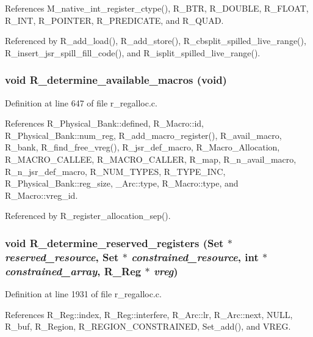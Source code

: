 References M\_\-native\_\-int\_\-register\_\-ctype(), R\_\-BTR, R\_\-DOUBLE, R\_\-FLOAT, R\_\-INT, R\_\-POINTER, R\_\-PREDICATE, and R\_\-QUAD.

Referenced by R\_\-add\_\-load(), R\_\-add\_\-store(), R\_\-cbsplit\_\-spilled\_\-live\_\-range(), R\_\-insert\_\-jsr\_\-spill\_\-fill\_\-code(), and R\_\-isplit\_\-spilled\_\-live\_\-range().
\subsubsection{\setlength{\rightskip}{0pt plus 5cm}void R\_\-determine\_\-available\_\-macros (void)}\label{r__regalloc_8c_268621ded44a6e33e4f2dcffc50fab76}




Definition at line 647 of file r\_\-regalloc.c.

References R\_\-Physical\_\-Bank::defined, R\_\-Macro::id, R\_\-Physical\_\-Bank::num\_\-reg, R\_\-add\_\-macro\_\-register(), R\_\-avail\_\-macro, R\_\-bank, R\_\-find\_\-free\_\-vreg(), R\_\-jsr\_\-def\_\-macro, R\_\-Macro\_\-Allocation, R\_\-MACRO\_\-CALLEE, R\_\-MACRO\_\-CALLER, R\_\-map, R\_\-n\_\-avail\_\-macro, R\_\-n\_\-jsr\_\-def\_\-macro, R\_\-NUM\_\-TYPES, R\_\-TYPE\_\-INC, R\_\-Physical\_\-Bank::reg\_\-size, \_\-Arc::type, R\_\-Macro::type, and R\_\-Macro::vreg\_\-id.

Referenced by R\_\-register\_\-allocation\_\-sep().
\subsubsection{\setlength{\rightskip}{0pt plus 5cm}void R\_\-determine\_\-reserved\_\-registers (\bf{Set} $\ast$ {\em reserved\_\-resource}, \bf{Set} $\ast$ {\em constrained\_\-resource}, int $\ast$ {\em constrained\_\-array}, \bf{R\_\-Reg} $\ast$ {\em vreg})}\label{r__regalloc_8c_d15b180b80eabf5ae708060c00827f8f}




Definition at line 1931 of file r\_\-regalloc.c.

References R\_\-Reg::index, R\_\-Reg::interfere, R\_\-Arc::lr, R\_\-Arc::next, NULL, R\_\-buf, R\_\-Region, R\_\-REGION\_\-CONSTRAINED, Set\_\-add(), and VREG.

